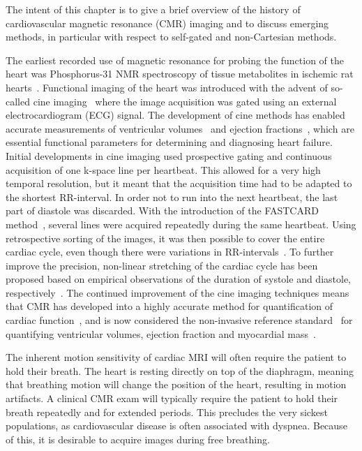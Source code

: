 The intent of this chapter is to give a brief overview of the history of cardiovascular magnetic resonance (CMR)  imaging and to discuss emerging methods, in particular with respect to self-gated and non-Cartesian methods. 

The earliest recorded use of magnetic resonance for probing the function of the heart was Phosphorus-31 NMR spectroscopy of tissue metabolites in ischemic rat hearts~\cite{Hoult1974,Gadian1976,Jacobus1977}. Functional imaging of the heart was introduced with the advent of so-called cine imaging~\cite{Herfkens1983,Lanzer1984,Waterton1985,Sechtem1987a} where the image acquisition was gated using an external electrocardiogram (ECG)  signal. The development of cine methods has enabled accurate measurements of ventricular volumes~\cite{Sechtem1987b} and ejection fractions~\cite{Utz1987}, which are essential functional parameters for determining and diagnosing heart failure. Initial developments in cine imaging used prospective gating and continuous acquisition of one k-space line per heartbeat. This allowed for a very high temporal resolution, but it meant that the acquisition time had to be adapted to the shortest RR-interval. In order not to run into the next heartbeat, the last part of diastole was discarded. With the introduction of the FASTCARD method~\cite{Foo1995}, several lines were acquired repeatedly during the same heartbeat. Using retrospective sorting of the images, it was then possible to cover the entire cardiac cycle, even though there were variations in RR-intervals~\cite{Lenz1989}. To further improve the precision, non-linear stretching of the cardiac cycle has been proposed based on empirical observations of the duration of systole and diastole, respectively~\cite{Feinstein1997}. The continued improvement of the cine imaging techniques means that CMR has developed into a highly accurate method for quantification of cardiac function~\cite{VanDerGeest1999}, and is now considered the non-invasive reference standard~\cite{Pennell2004} for quantifying ventricular volumes, ejection fraction and myocardial mass~\cite{Kramer2020}.

The inherent motion sensitivity of cardiac MRI will often require the patient to hold their breath. The heart is resting directly on top of the diaphragm, meaning that breathing motion will change the position of the heart, resulting in motion artifacts. A clinical CMR exam will typically require the patient to hold their breath repeatedly and for extended periods. This precludes the very sickest populations, as cardiovascular disease is often associated with dyspnea. Because of this, it is desirable to acquire images during free breathing.

